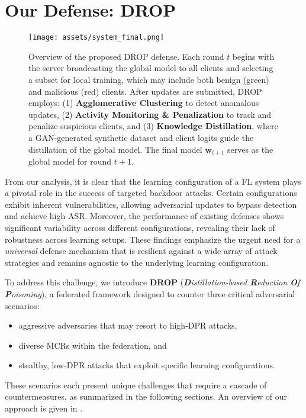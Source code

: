 \section{Our Defense: DROP}
\label{sec:proposed_defense}

\begin{figure*}[htbp]
    \centering
    \texttt{[image: assets/system\_final.png]}
    \caption{Overview of the proposed DROP defense. Each round \( t \) begins with the server broadcasting the global model to all clients and selecting a subset for local training, which may include both benign (green) and malicious (red) clients. After updates are submitted, DROP employs: (1) \textbf{Agglomerative Clustering} to detect anomalous updates, (2) \textbf{Activity Monitoring \& Penalization} to track and penalize suspicious clients, and (3) \textbf{Knowledge Distillation}, where a GAN-generated synthetic dataset and client logits guide the distillation of the global model. The final model \( \mathbf{w}_{t+1} \) serves as the global model for round \( t+1 \).}
    \label{fig:drops} 
\end{figure*}

From our analysis, it is clear that the learning configuration of a FL system plays a pivotal role in the success of targeted backdoor attacks. Certain configurations exhibit inherent vulnerabilities, allowing adversarial updates to bypass detection and achieve high ASR. Moreover, the performance of existing defenses shows significant variability across different configurations, revealing their lack of robustness across learning setups. These findings emphasize the urgent need for a \textit{universal} defense mechanism that is resilient against a wide array of attack strategies and remains agnostic to the underlying learning configuration. 

To address this challenge, we introduce \textbf{DROP} (\textit{\textbf{D}istillation-based \textbf{R}eduction \textbf{O}f \textbf{P}oisoning}), a federated framework designed to counter three critical adversarial scenarios:
\begin{itemize}
    \item aggressive adversaries that may resort to high-DPR attacks,
    \item diverse MCRs  within the federation, and
    \item stealthy, low-DPR attacks that exploit specific learning configurations.
\end{itemize}
These scenarios each present unique challenges that require a cascade of countermeasures, as summarized in the following sections. An overview of our approach is given in .
%

